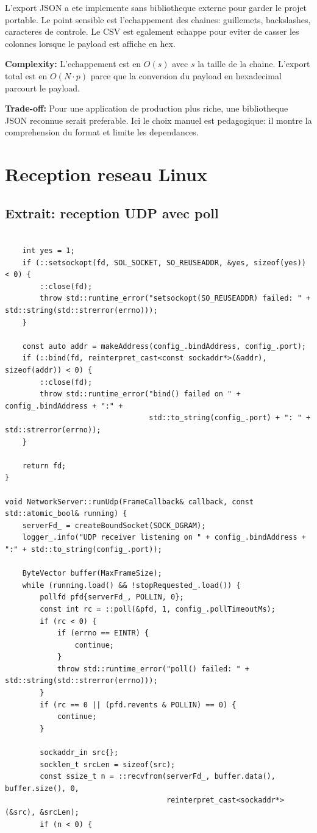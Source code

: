 \documentclass[10pt,a4paper]{article}
\newcommand{\complexity}[1]{\textbf{Complexity:} #1}
\newcommand{\tradeoff}[1]{\textbf{Trade-off:} #1}
\begin{document}
L'export JSON a ete implemente sans bibliotheque externe pour garder le projet portable. Le point sensible est l'echappement des chaines: guillemets, backslashes, caracteres de controle. Le CSV est egalement echappe pour eviter de casser les colonnes lorsque le payload est affiche en hex.

\complexity{L'echappement est en $O(s)$ avec $s$ la taille de la chaine. L'export total est en $O(N \cdot p)$ parce que la conversion du payload en hexadecimal parcourt le payload.}

\tradeoff{Pour une application de production plus riche, une bibliotheque JSON reconnue serait preferable. Ici le choix manuel est pedagogique: il montre la comprehension du format et limite les dependances.}

\section{Reception reseau Linux}

\subsection{Extrait: reception UDP avec poll}
\begin{lstlisting}[caption={Boucle UDP Linux avec poll}]

    int yes = 1;
    if (::setsockopt(fd, SOL_SOCKET, SO_REUSEADDR, &yes, sizeof(yes)) < 0) {
        ::close(fd);
        throw std::runtime_error("setsockopt(SO_REUSEADDR) failed: " + std::string(std::strerror(errno)));
    }

    const auto addr = makeAddress(config_.bindAddress, config_.port);
    if (::bind(fd, reinterpret_cast<const sockaddr*>(&addr), sizeof(addr)) < 0) {
        ::close(fd);
        throw std::runtime_error("bind() failed on " + config_.bindAddress + ":" +
                                 std::to_string(config_.port) + ": " + std::strerror(errno));
    }

    return fd;
}

void NetworkServer::runUdp(FrameCallback& callback, const std::atomic_bool& running) {
    serverFd_ = createBoundSocket(SOCK_DGRAM);
    logger_.info("UDP receiver listening on " + config_.bindAddress + ":" + std::to_string(config_.port));

    ByteVector buffer(MaxFrameSize);
    while (running.load() && !stopRequested_.load()) {
        pollfd pfd{serverFd_, POLLIN, 0};
        const int rc = ::poll(&pfd, 1, config_.pollTimeoutMs);
        if (rc < 0) {
            if (errno == EINTR) {
                continue;
            }
            throw std::runtime_error("poll() failed: " + std::string(std::strerror(errno)));
        }
        if (rc == 0 || (pfd.revents & POLLIN) == 0) {
            continue;
        }

        sockaddr_in src{};
        socklen_t srcLen = sizeof(src);
        const ssize_t n = ::recvfrom(serverFd_, buffer.data(), buffer.size(), 0,
                                     reinterpret_cast<sockaddr*>(&src), &srcLen);
        if (n < 0) {
\end{lstlisting}
\end{document}
